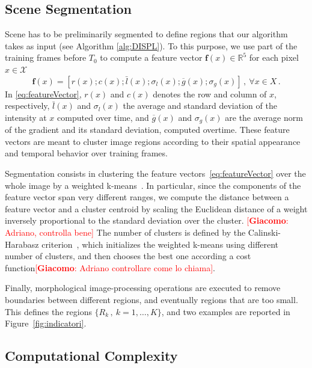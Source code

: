\documentclass{llncs}
\newcommand{\gi}[1]{{\textcolor{red}{[\small \textbf{Giacomo}: #1]}}}
\begin{document}
\subsection{Scene Segmentation}\label{subsec:Segmentation}
Scene has to be preliminarily segmented to define regions that our algorithm takes as input (see Algorithm \ref{alg:DISPL}). To this purpose, we use part of the training frames before $T_0$ to compute a feature vector $\textbf{f}(x)\in \mathbb{R}^5$ for each pixel $x\in\mathcal{X}$ 
\begin{equation}
\label{eq:featureVector}
\textbf{f}(x)=\left[r(x);c(x);\bar{l}(x);\sigma_{l}(x);\overline{g}(x);\sigma_{g}(x)\right]\,, \ \forall x \in X\,.
\end{equation}
In \eqref{eq:featureVector}, $r(x)$ and $c(x)$ denotes the row and column of $x$, respectively, $\bar{l}(x)$ and $\sigma_{l}(x)$ the average and standard deviation of the intensity at $x$ computed over time, and $\overline{g}(x)$ and $\sigma_g(x)$ are the average norm of the gradient and its standard deviation, computed overtime. These feature vectors are meant to cluster image regions according to their spatial appearance and temporal behavior over training frames.

Segmentation consists in clustering the feature vectors~\eqref{eq:featureVector} over the whole image by a weighted k-means~\cite{kottke1994motion}. In particular, since the components of the feature vector span very different ranges, we compute the distance between a feature vector and a cluster centroid by scaling the Euclidean distance of a weight inversely proportional to the standard deviation over the cluster. \gi{Adriano, controlla bene}
The number of clusters is defined by the Calinski-Harabasz criterion~\cite{calinski1974dendrite}, which initializes the weighted k-means using different number of clusters, and then chooses the best one according a cost function\gi{Adriano controllare come lo chiama}. 

Finally, morphological image-processing operations are executed to remove boundaries between different regions, and eventually regions that are too small. This defines the regions $\{R_k\,, \ k=1,\dots,K\}$, and two examples are reported in Figure~\ref{fig:indicatori}.

\subsection{Computational Complexity}\label{subsec:coputationalComplexity}
\end{document}
